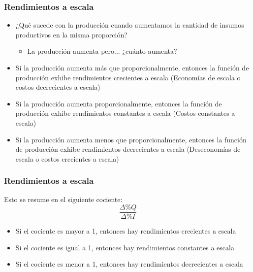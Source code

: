 \documentclass{beamer}
\begin{document}
\begin{frame}
\frametitle{Rendimientos a escala}
\begin{itemize}
    \item ¿Qué sucede con la producción cuando aumentamos la cantidad de insumos productivos en la misma proporción?
    \begin{itemize}
        \item La producción aumenta pero... ¿cuánto aumenta?
    \end{itemize}
    \item Si la producción aumenta más que proporcionalmente, entonces la función de producción exhibe rendimientos crecientes a escala (Economías de escala o costos decrecientes a escala)
    \item Si la producción aumenta proporcionalmente, entonces la función de producción exhibe rendimientos constantes a escala (Costos constantes a escala)
    \item Si la producción aumenta menos que proporcionalmente, entonces la función de producción exhibe rendimientos decrecientes a escala (Deseconomías de escala o costos crecientes a escala)
\end{itemize}
\end{frame}

\begin{frame}
    \frametitle{Rendimientos a escala}
    Esto se resume en el siguiente cociente:
    \[ \frac{\Delta \% Q}{\Delta \% I} \]
    \begin{itemize}
        \item Si el cociente es mayor a 1, entonces hay rendimientos crecientes a escala
        \item Si el cociente es igual a 1, entonces hay rendimientos constantes a escala
        \item Si el cociente es menor a 1, entonces hay rendimientos decrecientes a escala
    \end{itemize}
\end{frame}
\end{document}
